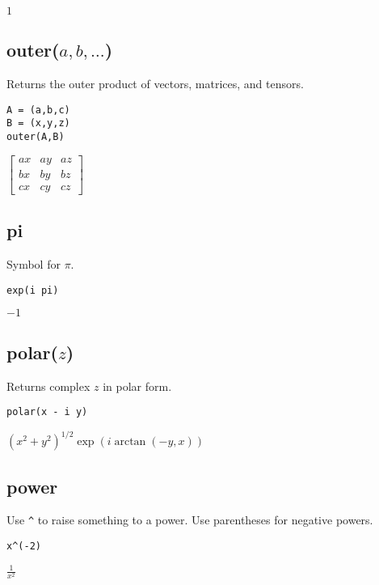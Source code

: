\noindent
$1$

\subsection*{outer($a,b,\ldots$)}

Returns the outer product of vectors, matrices, and tensors.

{\color{blue}
\begin{verbatim}
A = (a,b,c)
B = (x,y,z)
outer(A,B)
\end{verbatim}
}

\noindent
$\displaystyle
\begin{bmatrix}
a x & a y & a z
\\[1ex]
b x & b y & b z
\\[1ex]
c x & c y & c z
\end{bmatrix}
$

\subsection*{pi}

Symbol for $\pi$.

{\color{blue}
\begin{verbatim}
exp(i pi)
\end{verbatim}
}

\noindent
$-1$

\subsection*{polar($z$)}

Returns complex $z$ in polar form.

{\color{blue}
\begin{verbatim}
polar(x - i y)
\end{verbatim}
}

\noindent
$\displaystyle (x^2+y^2)^{1/2}\exp(i\arctan(-y,x))$

\subsection*{power}

Use \verb$^$ to raise something to a power.
Use parentheses for negative powers.

{\color{blue}
\begin{verbatim}
x^(-2)
\end{verbatim}
}

\noindent
$\displaystyle \frac{1}{x^2}$

